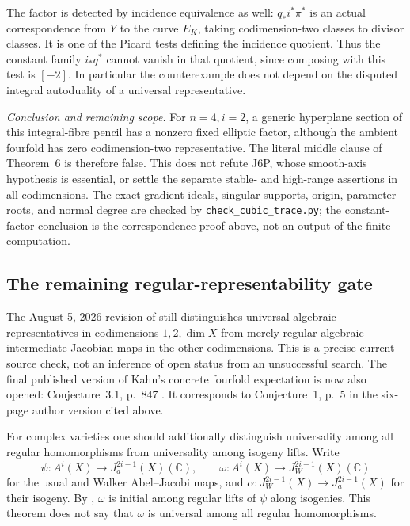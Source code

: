The factor is detected by incidence equivalence as well:
$q_*i^*\pi^*$ is an actual correspondence from $Y$ to the
curve $E_K$, taking codimension-two classes to divisor
classes. It is one of the Picard tests defining the
incidence quotient. Thus the constant family $i_*q^*$
cannot vanish in that quotient, since composing with
this test is $[-2]$. In particular the counterexample
does not depend on the disputed integral autoduality
of a universal representative.

\emph{Conclusion and remaining scope.}
For $n=4,i=2$, a generic hyperplane section of this
integral-fibre pencil has a nonzero fixed elliptic
factor, although the ambient fourfold has zero
codimension-two representative. The literal middle
clause of Theorem~6 is therefore false. This does not
refute J6P, whose smooth-axis hypothesis is essential,
or settle the separate stable- and high-range assertions
in all codimensions. The exact gradient ideals,
singular supports, origin, parameter roots, and normal
degree are checked by \texttt{check\_cubic\_trace.py};
the constant-factor conclusion is the correspondence
proof above, not an output of the finite computation.


\subsection{The remaining regular-representability gate}
The August 5, 2026 revision of
\cite[Introduction, p.~1]{DGJ_ACMVTwist2026} still distinguishes
universal algebraic representatives in codimensions $1,2,\dim X$
from merely regular algebraic intermediate-Jacobian maps in
the other codimensions. This is a precise current source check,
not an inference of open status from an unsuccessful search.
The final published version of Kahn's concrete fourfold
expectation is now also opened: Conjecture~3.1, p.~847
\cite{DGJ_Kahn2021}. It corresponds to Conjecture~1, p.~5 in
the six-page author version cited above.

For complex varieties one should additionally distinguish
universality among all regular homomorphisms from universality
among isogeny lifts. Write
\[
 \psi:A^i(X)\longrightarrow J_a^{2i-1}(X)(\mathbb C),\qquad
 \omega:A^i(X)\longrightarrow J_W^{2i-1}(X)(\mathbb C)
\]
for the usual and Walker Abel--Jacobi maps, and
$\alpha:J_W^{2i-1}(X)\to J_a^{2i-1}(X)$ for their isogeny.
By \cite[Theorem 2.3, p.~12]{DGJ_ACMVWalker}, $\omega$ is
initial among regular lifts of $\psi$ along isogenies. This
theorem does not say that $\omega$ is universal among all
regular homomorphisms.

